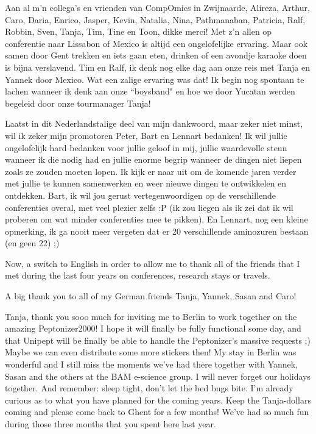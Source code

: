 Aan al m'n collega's en vrienden van CompOmics in Zwijnaarde, Alireza, Arthur, Caro, Daria, Enrico, Jasper, Kevin, Natalia, Nina, Pathmanaban, Patricia, Ralf, Robbin, Sven, Tanja, Tim, Tine en Toon, dikke merci!
Met z'n allen op conferentie naar Lissabon of Mexico is altijd een ongelofelijke ervaring.
Maar ook samen door Gent trekken en iets gaan eten, drinken of een avondje karaoke doen is bijna verslavend.
Tim en Ralf, ik denk nog elke dag aan onze reis met Tanja en Yannek door Mexico.
Wat een zalige ervaring was dat!
Ik begin nog spontaan te lachen wanneer ik denk aan onze ``boysband" en hoe we door Yucatan werden begeleid door onze tourmanager Tanja!

Laatst in dit Nederlandstalige deel van mijn dankwoord, maar zeker niet minst, wil ik zeker mijn promotoren Peter, Bart en Lennart bedanken!
Ik wil jullie ongelofelijk hard bedanken voor jullie geloof in mij, jullie waardevolle steun wanneer ik die nodig had en jullie enorme begrip wanneer de dingen niet liepen zoals ze zouden moeten lopen.
Ik kijk er naar uit om de komende jaren verder met jullie te kunnen samenwerken en weer nieuwe dingen te ontwikkelen en ontdekken.
Bart, ik wil jou gerust vertegenwoordigen op de verschillende conferenties overal, met veel plezier zelfs :P (ik zou liegen als ik zei dat ik wil proberen om wat minder conferenties mee te pikken).
En Lennart, nog een kleine opmerking, ik ga nooit meer vergeten dat er 20 verschillende aminozuren bestaan (en geen 22) ;)

Now, a switch to English in order to allow me to thank all of the friends that I met during the last four years on conferences, research stays or travels.

A big thank you to all of my German friends Tanja, Yannek, Sasan and Caro!

Tanja, thank you sooo much for inviting me to Berlin to work together on the amazing Peptonizer2000!
I hope it will finally be fully functional some day, and that Unipept will be finally be able to handle the Peptonizer's massive requests ;)
Maybe we can even distribute some more stickers then!
My stay in Berlin was wonderful and I still miss the moments we've had there together with Yannek, Sasan and the others at the BAM e-science group.
I will never forget our holidays together.
And remember: sleep tight, don't let the bed bugs bite.
I'm already curious as to what you have planned for the coming years.
Keep the Tanja-dollars coming and please come back to Ghent for a few months!
We've had so much fun during those three months that you spent here last year.

